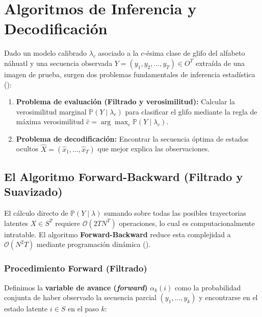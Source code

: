 \documentclass[
  spanish,
  us-letterpaper,
]{scrreprt}
\providecommand{\tightlist}{%
  \setlength{\itemsep}{0pt}\setlength{\parskip}{0pt}}
\theoremstyle{definition}
\theoremstyle{remark}
\begin{document}
\section{Algoritmos de Inferencia y
Decodificación}\label{algoritmos-de-inferencia-y-decodificaciuxf3n}

Dado un modelo calibrado \(\lambda_c\) asociado a la \(c\)-ésima clase
de glifo del alfabeto náhuatl y una secuencia observada
\(Y = (y_1, y_2, \dots, y_T) \in O^T\) extraída de una imagen de prueba,
surgen dos problemas fundamentales de inferencia estadística
():

\begin{enumerate}
\def\labelenumi{\arabic{enumi}.}
\tightlist
\item
  \textbf{Problema de evaluación (Filtrado y verosimilitud):} Calcular
  la verosimilitud marginal \(\mathbb{P}(Y \mid \lambda_c)\) para
  clasificar el glifo mediante la regla de máxima verosimilitud
  \(\hat{c} = \arg\max_{c} \mathbb{P}(Y \mid \lambda_c)\).
\item
  \textbf{Problema de decodificación:} Encontrar la secuencia óptima de
  estados ocultos \(\hat{X} = (\hat{x}_1, \dots, \hat{x}_T)\) que mejor
  explica las observaciones.
\end{enumerate}

\subsection{El Algoritmo Forward-Backward (Filtrado y
Suavizado)}\label{el-algoritmo-forward-backward-filtrado-y-suavizado}

El cálculo directo de \(\mathbb{P}(Y \mid \lambda)\) sumando sobre todas
las posibles trayectorias latentes \(X \in S^T\) requiere
\(\mathcal{O}(2T N^T)\) operaciones, lo cual es computacionalmente
intratable. El algoritmo \textbf{Forward-Backward} reduce esta
complejidad a \(\mathcal{O}(N^2 T)\) mediante programación dinámica
().

\subsubsection{Procedimiento Forward
(Filtrado)}\label{procedimiento-forward-filtrado}

Definimos la \textbf{variable de avance (\emph{forward})}
\(\alpha_k(i)\) como la probabilidad conjunta de haber observado la
secuencia parcial \((y_1, \dots, y_k)\) y encontrarse en el estado
latente \(i \in S\) en el paso \(k\):
\end{document}
